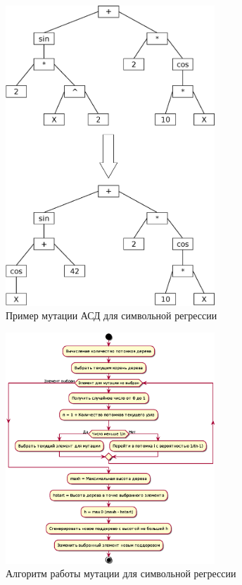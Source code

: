 \begin{figure}[h!]
\centering
\includegraphics[width=0.7\textwidth]{science/ast_mutation_example}
\caption{Пример мутации АСД для символьной регрессии}
\label{figure:astMutationExample}
\end{figure}

\begin{figure}[h!]
\centering
\includegraphics[width=0.7\textwidth]{science/mutation}
\caption{Алгоритм работы мутации для символьной регрессии}
\label{figure:astMutation}
\end{figure}


